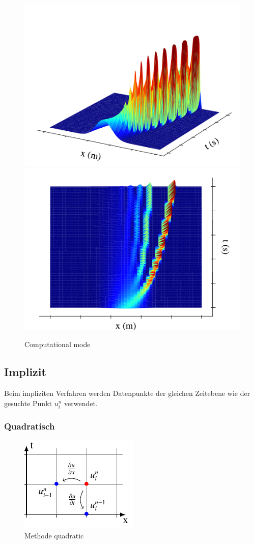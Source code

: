     \begin{figure}
	\centering
	\includegraphics[width=.49\textwidth]{papers/burgers/BurgersEquation/images/Leap_Frog_front.pdf}
	\includegraphics[width=.49\textwidth]{papers/burgers/BurgersEquation/images/Leap_Frog_top.pdf}
	\caption{Computational mode}
	\label{burgers:fig:cm1}
	\end{figure}


	
\subsection{Implizit}

	Beim impliziten Verfahren werden Datenpunkte der gleichen Zeitebene wie der gesuchte Punkt $u_{i}^{n}$ verwendet.
	

\subsubsection{Quadratisch}
     \begin{figure}
	\centering
	\includegraphics[height=.4\textwidth]{papers/burgers/BurgersEquation/tikz/quadratic/quadratic.pdf}
	\caption{Methode quadratic}
	\label{burgers:fig:quadratic}
	\end{figure}

